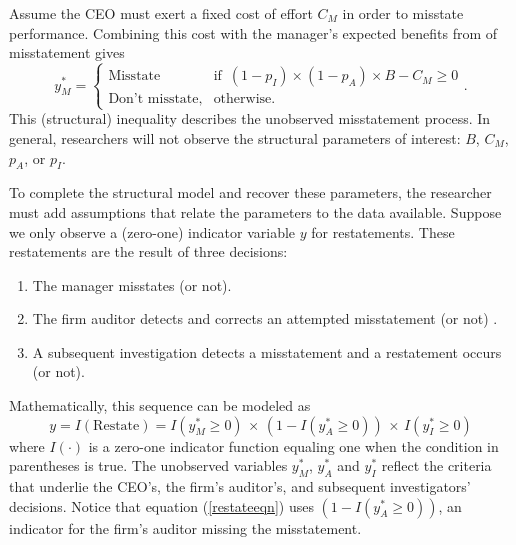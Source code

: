 \documentclass[12pt,reqno,titlepage]{amsart}
\theoremstyle{definition}
\begin{document}
\begin{doublespace}
Assume the CEO must exert a fixed cost of effort $C_M$ in order to misstate performance. 
Combining this cost with the manager's expected benefits from of misstatement gives
\begin{equation}\label{bencost}
		y_M^* = 
		  \begin{cases}
				\mbox{Misstate} & \mbox{if }\, (1-p_I) \times (1-p_A) \times B - C_M \ge 0\\
				\mbox{Don't misstate,} & \mbox{otherwise}.
		  \end{cases}.
\end{equation}
This (structural) inequality describes the unobserved misstatement process. 
In general, researchers will not observe the structural parameters of
interest: $B$, $C_M$, $p_A$, or $p_I$.

To complete the structural model and recover these parameters, 
the researcher must add assumptions that relate the parameters to the data available.
Suppose we only observe a (zero-one) indicator variable $y$ for restatements.
These restatements are the result of three decisions:
\begin{enumerate}
\item The manager misstates (or not).
\item The firm auditor detects and corrects an attempted misstatement (or not) .
\item A subsequent investigation detects a misstatement and a restatement occurs (or not).
\end{enumerate}

Mathematically, this sequence can be modeled as
\begin{equation}\label{restateeqn}
 y = I(\mbox{Restate}) = I(y^*_M \ge 0) \, \times\, (1 - I(y^*_A \ge 0)) \, \times\, I(y^*_I \ge 0)
\end{equation}
where $I(\cdot)$ is a zero-one indicator function equaling one when the condition in parentheses is true.
The unobserved variables $y^*_M$, $y^*_A$ and $y^*_I$ reflect the criteria that underlie the CEO's, 
the firm's auditor's, and subsequent investigators' decisions.
Notice that equation (\ref{restateeqn}) uses $(1 - I(y^*_A \ge 0))$, an indicator for the firm's auditor missing the misstatement.


\end{doublespace}
\end{document}
